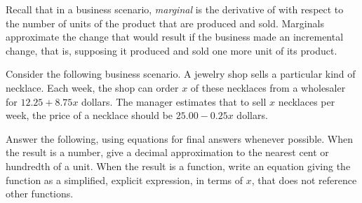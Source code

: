 \label{sec:biz-mod-marginal}

Recall that in a business scenario, \emph{marginal \Quantity} is the derivative of \emph{\Quantity} with respect to the number of units of the product that are produced and sold.
Marginals approximate the change that would result if the business made an incremental change, that is, supposing it produced and sold one more unit of its product.




Consider the following business scenario.
A jewelry shop sells a particular kind of necklace.
Each week, the shop can order $x$ of these necklaces from a wholesaler for $12.25 + 8.75 x$ dollars.
The manager estimates that to sell $x$ necklaces per week, the price of a necklace should be $25.00 - 0.25 x$ dollars.

Answer the following, using equations for final answers whenever possible.
When the result is a number, give a decimal approximation to the nearest cent or hundredth of a unit.
When the result is a function, write an equation giving the function as a simplified, explicit expression, in terms of $x$, that does not reference other functions.

